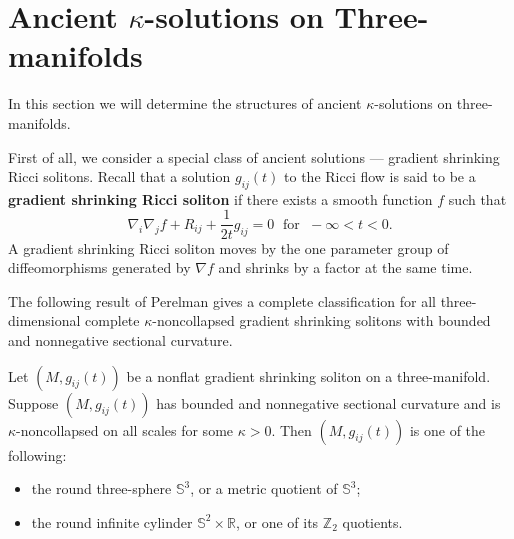 \section{Ancient \texorpdfstring{$\kappa$}{kappa}-solutions on Three-manifolds}

In this section we will determine the structures of ancient
$\kappa$-solutions on three-manifolds.

First of all, we consider a special class of ancient solutions ---
gradient shrinking Ricci solitons. Recall that a solution
$g_{ij}(t)$ to the Ricci flow is said to be a \textbf{gradient
shrinking Ricci soliton}
if there exists a smooth function $f$ such that \begin{equation}
\nabla_i\nabla_j f+R_{ij}+\frac{1}{2t}g_{ij}=0\; \mbox{ for }\;
-\infty<t<0. %
\end{equation} A gradient shrinking Ricci soliton moves by the one parameter
group of diffeomorphisms generated by $\nabla f$ and shrinks by a
factor at the same time.

The following result of Perelman \cite{P2} gives a complete
classification for all three-dimensional complete
$\kappa$-noncollapsed gradient shrinking solitons with bounded and
nonnegative sectional curvature.

\begin{lemma}
  \label{lem:cz-three-dimensional-shrinking-soliton-classification}
 Let $(M,g_{ij}(t))$ be a nonflat gradient shrinking
soliton on a three-manifold. Suppose $(M,g_{ij}(t))$ has bounded
and nonnegative sectional curvature and is $\kappa$-noncollapsed
on all scales for some $\kappa>0$. Then $(M,g_{ij}(t))$ is one of
the following:
\begin{itemize}
\item[(i)] the round three-sphere $\mathbb{S}^3$, or a metric
quotient of $\mathbb{S}^3$; \item[(ii)] the round infinite
cylinder $\mathbb{S}^2\times \mathbb{R}$, or one of its
$\mathbb{Z}_2$ quotients.
\end{itemize}
\end{lemma}

